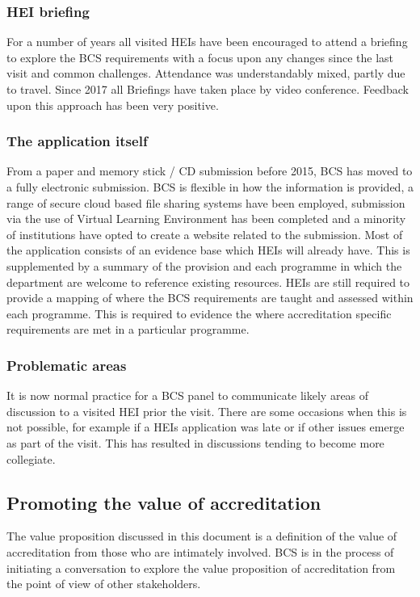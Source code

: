 \documentclass[sigconf]{acmart}
\begin{document}
\subsubsection{HEI briefing}
For a number of years all visited HEIs have been encouraged to attend a briefing to explore the BCS requirements with a focus upon any changes since the last visit and common challenges.%
Attendance was understandably mixed, partly due to travel. Since 2017 all Briefings have taken place by video conference. Feedback upon this approach has been very positive.

\subsubsection{The application itself}
From a paper and memory stick / CD submission before 2015, BCS has moved to a fully electronic submission. BCS is flexible in how the information is provided, a range of secure cloud based file sharing systems have been employed, submission via the use of Virtual Learning Environment has been completed and a minority of institutions have opted to create a website related to the submission. Most of the application consists of an evidence base which HEIs will already have. This is supplemented by a summary of the provision and each programme in which the department are welcome to reference existing resources. HEIs are still required to provide a mapping of where the BCS requirements are taught and assessed within each programme. This is required to evidence the where accreditation specific requirements are met in a particular programme.

\subsubsection{Problematic areas}
It is now normal practice for a BCS panel to communicate likely areas of discussion to a visited HEI prior the visit. There are some occasions when this is not possible, for example if a HEIs application was late or if other issues emerge as part of the visit.   This has resulted in discussions tending to become more collegiate. 

\subsection{Promoting the value of accreditation}
The value proposition discussed in this document is a definition of the value of accreditation from those who are intimately involved. BCS is in the process of initiating a conversation to explore the value proposition of accreditation from the point of view of other stakeholders.
\end{document}
